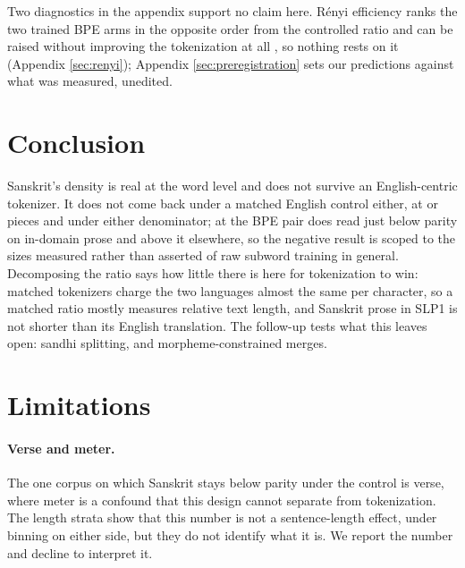 \documentclass[11pt]{article}
\begin{document}
Two diagnostics in the appendix support no claim here. R\'enyi efficiency
\citep{zouhar-etal-2023-tokenization} ranks the two trained BPE arms in the opposite order
from the controlled ratio and can be raised without improving the tokenization at all
\citep{cognetta-etal-2024-counterexamples}, so nothing rests on it (Appendix
\ref{sec:renyi}); Appendix \ref{sec:preregistration} sets our predictions against what was
measured, unedited.

\section{Conclusion}
\label{sec:conclusion}

Sanskrit's density is real at the word level and does not survive an English-centric
tokenizer. It does not come back under a matched English control either, at
\numVocabSmall{} or \numVocabLarge{} pieces and under either denominator; at
\numVocabHuge{} the BPE pair does read just below parity on in-domain prose and above it
elsewhere, so the negative result is scoped to the sizes measured rather than asserted of
raw subword training in general. Decomposing the ratio says how little there is here for
tokenization to win: matched tokenizers charge the two languages almost the same per
character, so a matched ratio mostly measures relative text length, and Sanskrit prose in
SLP1 is not shorter than its English translation. The follow-up tests what this leaves
open: sandhi splitting, and morpheme-constrained merges.

\section*{Limitations}

\paragraph{Verse and meter.} The one corpus on which Sanskrit stays below parity under the
control is verse, where meter is a confound that this design cannot separate from
tokenization. The length strata show that this number is not a sentence-length effect,
under binning on either side, but they do not identify what it is. We report the number and
decline to interpret it.
\end{document}
